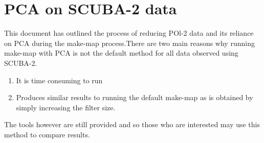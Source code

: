 \chapter{PCA on SCUBA-2 data}
\label{app:pca}

This document has outlined the process of reducing POl-2 data and its
reliance on PCA during the make-map process.There are two main reasons 
why running make-map with PCA is not the default method for all data observed
using SCUBA-2. 

\begin{enumerate}
\item It is time consuming to run
\item Produces similar results to running the default make-map as 
is obtained by simply increasing the filter size.
\end{enumerate}

The tools however are still provided and so those who are interested
may use this method to compare results.
